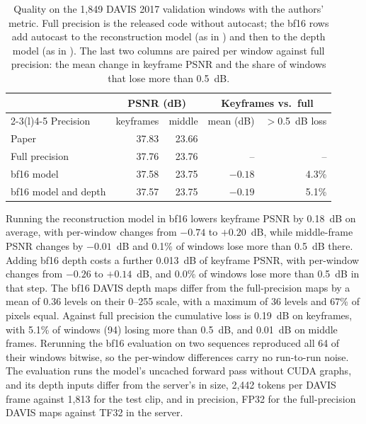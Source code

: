 \begin{table}[t]
\centering
\footnotesize
\setlength{\tabcolsep}{3.5pt}
\begin{tabular}{@{}lrrrr@{}}
\toprule
 & \multicolumn{2}{c}{PSNR (dB)} & \multicolumn{2}{c}{Keyframes vs.\ full} \\
\cmidrule(lr){2-3}\cmidrule(l){4-5}
Precision & keyframes & middle & mean (dB) & $>$0.5~dB loss \\ %
\midrule
Paper~\cite{streamsplat2026} & 37.83 & 23.66 & & \\ %
Full precision & 37.76 & 23.76 & -- & -- \\ %
bf16 model & 37.58 & 23.75 & $-0.18$ & 4.3\% \\ %
bf16 model and depth & 37.57 & 23.75 & $-0.19$ & 5.1\% \\ %
\bottomrule
\end{tabular}
\caption{Quality on the 1,849 DAVIS 2017 validation windows with the authors' metric. %
Full precision is the released code without autocast; the bf16 rows add autocast to the reconstruction model (as in \opt{}) and then to the depth model (as in \optd{}). %
The last two columns are paired per window against full precision: the mean change in keyframe PSNR and the share of windows that lose more than 0.5~dB.} %
\label{tab:quality}
\end{table}

Running the reconstruction model in bf16 lowers keyframe PSNR by 0.18~dB on average, with per-window changes from $-0.74$ to $+0.20$~dB, while middle-frame PSNR changes by $-0.01$~dB and 0.1\% of windows lose more than 0.5~dB there. %
Adding bf16 depth costs a further 0.013~dB of keyframe PSNR, with per-window changes from $-0.26$ to $+0.14$~dB, and 0.0\% of windows lose more than 0.5~dB in that step. %
The bf16 DAVIS depth maps differ from the full-precision maps by a mean of 0.36 levels on their 0--255 scale, with a maximum of 36 levels and 67\% of pixels equal. %
Against full precision the cumulative loss is 0.19~dB on keyframes, with 5.1\% of windows (94) losing more than 0.5~dB, and 0.01~dB on middle frames. %
Rerunning the bf16 evaluation on two sequences reproduced all 64 of their windows bitwise, so the per-window differences carry no run-to-run noise. %
The evaluation runs the model's uncached forward pass without CUDA graphs, and its depth inputs differ from the server's in size, 2,442 tokens per DAVIS frame against 1,813 for the test clip, and in precision, FP32 for the full-precision DAVIS maps against TF32 in the server. %

